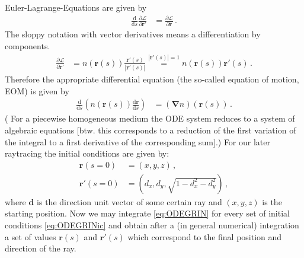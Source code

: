 \documentclass[12pt,a4paper,twoside,openright,BCOR10mm,headsepline,titlepage,abstracton,chapterprefix,final]{scrreprt}
\newcommand\Vector[1]{{\mathbf{#1}}}
\begin{document}
Euler-Lagrange-Equations are given by
\begin{align}
 \frac{\text{d}}{\text{d}s} \frac{\partial \mathcal{L}}{\partial \Vector{r}'} &= \frac{\partial \mathcal{L}}{\partial \Vector{r}}\,.
\end{align}
The sloppy notation with vector derivatives means a differentiation by components.
\begin{align}
 \frac{\partial \mathcal{L}}{\partial \Vector{r}'} &= n(\Vector{r}(s)) \frac{\Vector{r}'(s)}{|\Vector{r}'(s)|} \stackrel{|\Vector{r}'(s)|=1}{=} n(\Vector{r}(s))\Vector{r}'(s)\,.
\end{align}
Therefore the appropriate differential equation (the so-called equation of motion, EOM) is given by
\begin{align}
 \frac{\text{d}}{\text{d}s} \left(n(\Vector{r}(s)) \frac{\text{d}\Vector{r}}{\text{d}s}\right) &= (\Vector{\nabla} n)(\Vector{r}(s)) \label{eq:ODEGRIN}\,.
\end{align}
( For a piecewise homogeneous medium the ODE system reduces to a system of algebraic equations 
[btw. this corresponds to a reduction of the
first variation of the integral to a first derivative of the corresponding sum].) 
For our later raytracing the initial conditions are given by:
\begin{subequations}
\label{eq:ODEGRINic}
\begin{align}
 \Vector{r}(s=0) &= (x,y,z)\,,\\
 \Vector{r}'(s=0) &= (d_x, d_y, \sqrt{1-d_x^2-d_y^2})\,,
\end{align}
\end{subequations}
where $\Vector{d}$ is the direction unit vector of some certain ray and $(x,y,z)$ is the starting position.
Now we may integrate \eqref{eq:ODEGRIN} for every set of initial conditions \eqref{eq:ODEGRINic}
and obtain after a (in general numerical) integration a set of values $\Vector{r}(s)$ and $\Vector{r}'(s)$
which correspond to the final position and direction of the ray.
\end{document}
